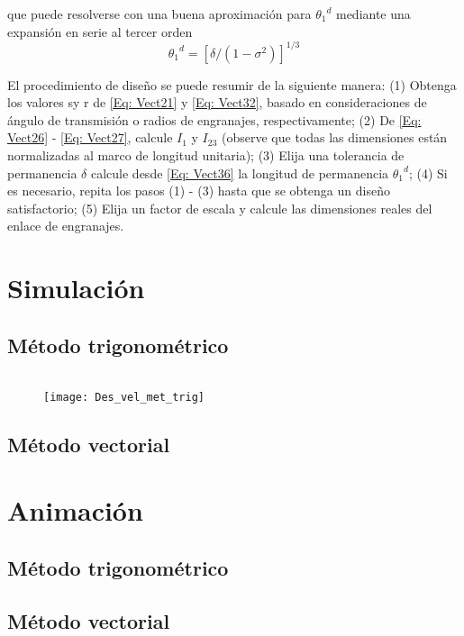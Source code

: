 \documentclass[12pt, final]{extarticle}
\begin{document}
que puede resolverse con una buena aproximación para ${\theta_1}^d$ mediante una expansión en serie al tercer orden
\begin{equation}
   {\theta_1}^d=[\delta/(1-{\sigma}^2)]^{1/3} 
   \label{Eq: Vect36}
\end{equation}

El procedimiento de diseño se puede resumir de la siguiente manera: (1) Obtenga los valores sy r de \eqref{Eq: Vect21} y \eqref{Eq: Vect32}, basado en consideraciones de ángulo de transmisión o radios de engranajes, respectivamente; (2) De \eqref{Eq: Vect26} - \eqref{Eq: Vect27}, calcule $I_1$ y $I_{23}$ (observe que todas las dimensiones están normalizadas al marco de longitud unitaria); (3) Elija una tolerancia de permanencia $\delta$ calcule desde \eqref{Eq: Vect36} la longitud de permanencia ${\theta_1}^d$; (4) Si es necesario, repita los pasos (1) - (3) hasta que se obtenga un diseño satisfactorio; (5) Elija un factor de escala y calcule las dimensiones reales del enlace de engranajes.





\newpage
\section{Simulación}
\subsection{Método trigonométrico}

{\small
\inputminted{matlab}{Codigos/ADA5_metodo_trig.m}}

\begin{figure}[ht]
    \centering
    \texttt{[image: Des\_vel\_met\_trig]}
\end{figure}

\newpage
\subsection{Método vectorial}



\newpage
\section{Animación}
\subsection{Método trigonométrico}

\subsection{Método vectorial}


\nocite{*}
\vfill


\end{document}
